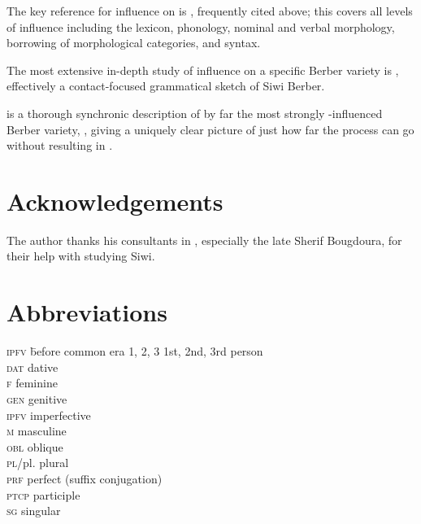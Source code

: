 \documentclass[output=paper]{langsci/langscibook}
\begin{document}
\begin{furtherreading}
\item[The key reference] for  influence on  is \citet{Kossmann2012}, frequently cited above; this covers all levels of influence including the lexicon, phonology, nominal and verbal morphology, borrowing of morphological categories, and syntax.
\item[The most extensive] in-depth study of  influence on a specific Berber variety is \citet{Souag2013book}, effectively a contact-focused grammatical sketch of Siwi Berber.
\item[\citet{Mourigh2016}] is a thorough synchronic description of by far the most strongly -influenced Berber variety, , giving a uniquely clear picture of just how far the process can go without resulting in .
\end{furtherreading}

\section*{Acknowledgements}

The author thanks his consultants in , especially the late Sherif Bougdoura, for their help with studying Siwi.

\section*{Abbreviations}
\begin{multicols}{2}
\begin{tabbing}
\textsc{ipfv} \hspace{1em} \= before common era\kill
\textsc{1, 2, 3} \> 1st, 2nd, 3rd person \\
\textsc{dat} \> dative \\
\textsc{f} \> feminine \\
\textsc{gen} \> genitive \\
\textsc{ipfv} \> imperfective  \\
\textsc{m} \> masculine \\
\textsc{obl} \> oblique \\
\textsc{pl}/pl. \> plural \\
\textsc{prf} \> perfect (suffix conjugation) \\
\textsc{ptcp} \> {participle} \\
\textsc{sg} \> singular
\end{tabbing}
\end{multicols}

\sloppy
\printbibliography[heading=subbibliography,notkeyword=this]
\end{document}
